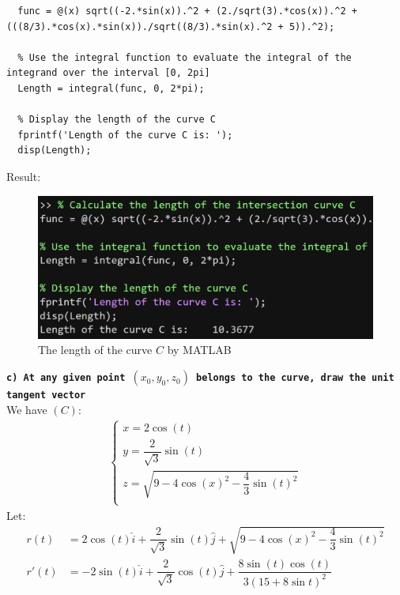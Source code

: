 \begin{lstlisting}[style=Matlab-editor]
  % Calculate the length of the intersection curve C
  func = @(x) sqrt((-2.*sin(x)).^2 + (2./sqrt(3).*cos(x)).^2 + (((8/3).*cos(x).*sin(x))./sqrt((8/3).*sin(x).^2 + 5)).^2);
  
  % Use the integral function to evaluate the integral of the integrand over the interval [0, 2pi]
  Length = integral(func, 0, 2*pi);
  
  % Display the length of the curve C
  fprintf('Length of the curve C is: ');
  disp(Length);  
\end{lstlisting}
Result:
\begin{figure}[H]
  \centering
  \includegraphics[width=12cm]{graphics/3b.png}
  \caption{The length of the curve $C$ by MATLAB}
\end{figure}

\textbf{ \texttt{c) At any given point $(x_0, y_0, z_0)$ belongs to the curve, draw the unit tangent vector} }\\[6pt]
We have $(C)$:
\begin{align}
  \begin{cases}
    x = 2\cos(t) \\
    y = \dfrac{2}{\sqrt{3}}\sin(t) \\
    z = \sqrt{  9 - 4\cos(x)^2 - \dfrac{4}{3}\sin(t)^2  } \\
  \end{cases}
\end{align}
Let:
\begin{align*}
  r(t)  &=  2\cos(t)\hat{i} + \dfrac{2}{\sqrt{3}}\sin(t)\hat{j} + \sqrt{  9 - 4\cos(x)^2 - \dfrac{4}{3}\sin(t)^2  }    \\
  r'(t) &=  -2\sin(t)\hat{i} + \dfrac{2}{\sqrt{3}}\cos(t)\hat{j} + \dfrac{8\sin(t)\cos(t)}{ 3(15+8\sin t)^2 }     \\
\end{align*}

